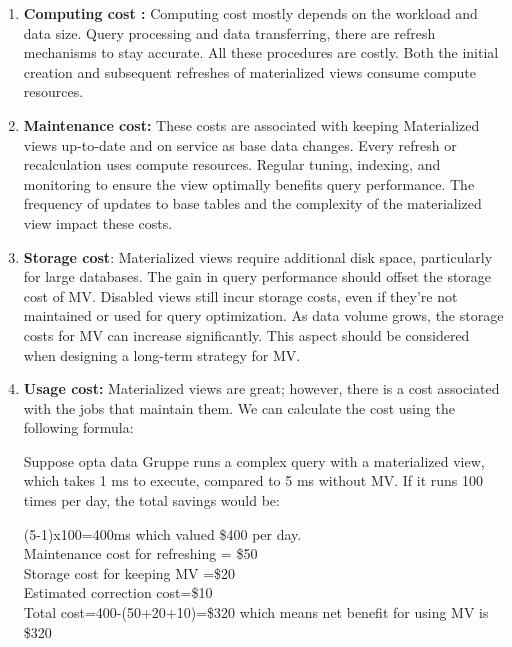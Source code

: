  \begin{enumerate}[label=\alph*)]
    \item \textbf{Computing cost :} Computing cost mostly depends on the workload and data size. Query processing and data transferring, there are refresh mechanisms to stay accurate. All these procedures are costly. Both the initial creation and subsequent refreshes of materialized views consume compute resources.
    
    \item \textbf{Maintenance cost:} These costs are associated with keeping Materialized views up-to-date and on service as base data changes. Every refresh or recalculation uses compute resources. Regular tuning, indexing, and monitoring to ensure the view optimally benefits query performance. The frequency of updates to base tables and the complexity of the materialized view impact these costs. 
    
    \item \textbf{Storage cost}: Materialized views require additional disk space, particularly for large databases. The gain in query performance should offset the storage cost of MV. Disabled views still incur storage costs, even if they're not maintained or used for query optimization. As data volume grows, the storage costs for MV can increase significantly. This aspect should be considered when designing a long-term strategy for MV. 
     
    \item \textbf{Usage cost:} Materialized views are great; however, there is a cost associated with the jobs that maintain them. We can calculate the cost using the following formula: \cite{10.1145/2206869.2206874}

    

  Suppose opta data Gruppe runs a complex query with a materialized view, which takes 1 ms to execute, compared to 5 ms without MV. If it runs 100 times per day, the total savings would be:
  
   (5-1)x100=400ms which valued \$400 per day.\\
   Maintenance cost for refreshing = \$50 \\
   Storage cost for keeping MV =\$20\\
   Estimated correction cost=\$10 \\
   Total cost={400-(50+20+10)}=\$320 which means net benefit for using MV is \$320

 
  
\end{enumerate}




